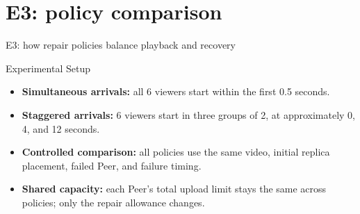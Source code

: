 \section{E3: policy comparison}
\begin{frame}{E3: how repair policies balance playback and recovery}

\begin{block}{Experimental Setup}
\begin{itemize}
  \item \textbf{Simultaneous arrivals:} all 6 viewers start within
        the first 0.5 seconds.
  \item \textbf{Staggered arrivals:} 6 viewers start in three groups
        of 2, at approximately 0, 4, and 12 seconds.
  \item \textbf{Controlled comparison:} all policies use the same
        video, initial replica placement, failed Peer, and failure timing.
  \item \textbf{Shared capacity:} each Peer's total upload limit
        stays the same across policies; only the repair allowance changes.
\end{itemize}
\end{block}

\end{frame}

